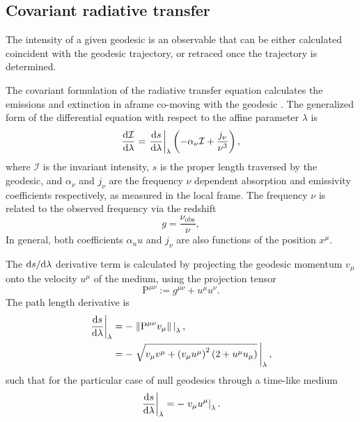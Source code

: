 \subsection{Covariant radiative transfer}

The intensity of a given geodesic is an observable that can be either calculated coincident with the geodesic trajectory, or retraced once the trajectory is determined.

The covariant formulation of the radiative transfer equation calculates the emissions and extinction in aframe co-moving with the geodesic \citep{fuerst_radiation_2004,younsi_general_2012}. The generalized form of the differential equation with respect to the affine parameter $\lambda$ is
\begin{equation}
    \label{eq:covariant-radiative-transfer}
    \frac{\text{d} \mathcal{I}}{\text{d} \lambda} = \left. \frac{\text{d} s}{\text{d} \lambda} \right\rvert_\lambda \left( -\alpha_\nu \mathcal{I} + \frac{j_\nu}{\nu^3} \right),
\end{equation}
where $\mathcal{I}$ is the invariant intensity, $s$ is the proper length traversed by the geodesic, and $\alpha_\nu$ and $j_\nu$ are the frequency $\nu$ dependent absorption and emissivity coefficients respectively, as measured in the local frame. The frequency $\nu$ is related to the observed frequency via the redshift
\begin{equation}
    g = \frac{\nu_\text{obs}}{\nu},
\end{equation}
In general, both coefficients $\alpha_nu$ and $j_\nu$ are also functions of the position $x^\mu$. 

The $\text{d} s / \text{d} \lambda$ derivative term is calculated by projecting the geodesic momentum $v_\mu$ onto the velocity $u^\mu$ of the medium, using the projection tensor
\begin{equation}
    \mathrm{P}^{\mu\nu} := g^{\mu\nu} + u^\mu u^\nu.
\end{equation}
The path length derivative is 
\begin{align}
    \left. \frac{\text{d} s}{\text{d} \lambda} \right\rvert_\lambda
    &= - \left. \left\lVert \mathrm{P}^{\mu\nu} v_\mu\right\rVert\, \right\rvert_\lambda,\\
    &= - \left. \sqrt{v_\mu v^\mu + \left(v_\mu u^\mu\right)^2 \left(2 + u^\mu u_\mu\right)} \, \right\rvert_\lambda,
\end{align}
such that for the particular case of null geodesics through a time-like medium
\begin{equation}
    \left. \frac{\text{d} s}{\text{d} \lambda} \right\rvert_\lambda = - \left. v_\mu u^\mu \right\rvert_\lambda.
\end{equation}


